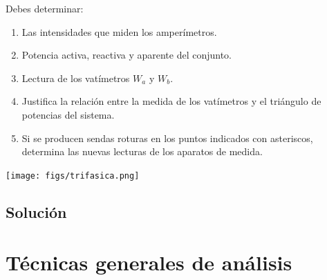 \documentclass[12pt]{article}
\begin{document}
Debes determinar:\vspace{0.5cm}

\begin{minipage}{0.45\textwidth}
\begin{enumerate}
\item Las intensidades que miden los amperímetros.
\item Potencia activa, reactiva y aparente del conjunto.
\item Lectura de los vatímetros $W_a$ y $W_b$.
\item Justifica la relación entre la medida de los vatímetros y el triángulo de potencias del sistema.
\item Si se producen sendas roturas en los puntos indicados con asteriscos, determina las nuevas lecturas de los aparatos de medida.
\end{enumerate}
\end{minipage}
\begin{minipage}{0.55\textwidth}
\texttt{[image: figs/trifasica.png]}
\end{minipage}

\subsection*{Solución}



\clearpage

\section{Técnicas generales de análisis}
\end{document}
